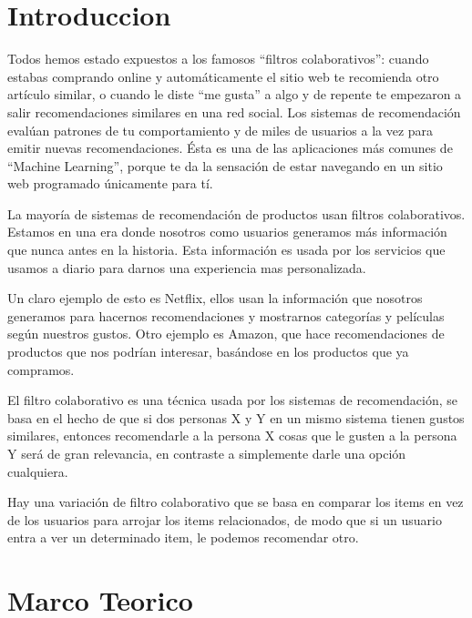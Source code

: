 \documentclass[preprint,12pt]{elsarticle}
\begin{document}
\section{Introduccion}

Todos hemos estado expuestos a los famosos “filtros colaborativos”: cuando estabas comprando online y automáticamente el sitio web te recomienda otro artículo similar, o cuando le diste “me gusta” a algo y de repente te empezaron a salir recomendaciones similares en una red social. Los sistemas de recomendación evalúan patrones de tu comportamiento y de miles de usuarios a la vez para emitir nuevas recomendaciones. Ésta es una de las aplicaciones más comunes de “Machine Learning”, porque te da la sensación de estar navegando en un sitio web programado únicamente para tí.

La mayoría de sistemas de recomendación de productos usan filtros colaborativos. Estamos en una era donde nosotros como usuarios generamos más información que nunca antes en la historia. Esta información es usada por los servicios que usamos a diario para darnos una experiencia mas personalizada.

Un claro ejemplo de esto es Netflix, ellos usan la información que nosotros generamos para hacernos recomendaciones y mostrarnos categorías y películas según nuestros gustos. Otro ejemplo es Amazon, que hace recomendaciones de productos que nos podrían interesar, basándose en los productos que ya compramos.

El filtro colaborativo es una técnica usada por los sistemas de recomendación, se basa en el hecho de que si dos personas X y Y en un mismo sistema tienen gustos similares, entonces recomendarle a la persona X cosas que le gusten a la persona Y será de gran relevancia, en contraste a simplemente darle una opción cualquiera.

Hay una variación de filtro colaborativo que se basa en comparar los items en vez de los usuarios para arrojar los items relacionados, de modo que si un usuario entra a ver un determinado item, le podemos recomendar otro.\\

\pagebreak
	
	

\section{Marco Teorico}
 
\end{document}
